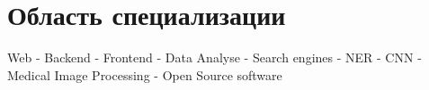 \section{Область специализации}
{Web - Backend - Frontend - Data Analyse - Search engines - NER - CNN - Medical Image Processing - Open Source software}